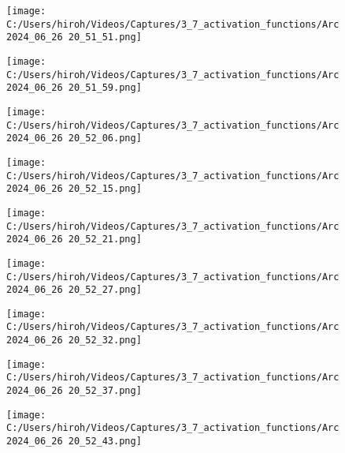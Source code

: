 \documentclass{ltjsarticle}
\begin{document}
\clearpage
\begin{figure}[htbp]
  \centering
  \texttt{[image: C:/Users/hiroh/Videos/Captures/3\_7\_activation\_functions/Arc 2024\_06\_26 20\_51\_51.png]}
\end{figure}
\begin{figure}[htbp]
  \centering
  \texttt{[image: C:/Users/hiroh/Videos/Captures/3\_7\_activation\_functions/Arc 2024\_06\_26 20\_51\_59.png]}
\end{figure}
\begin{figure}[htbp]
  \centering
  \texttt{[image: C:/Users/hiroh/Videos/Captures/3\_7\_activation\_functions/Arc 2024\_06\_26 20\_52\_06.png]}
\end{figure}
\begin{figure}[htbp]
  \centering
  \texttt{[image: C:/Users/hiroh/Videos/Captures/3\_7\_activation\_functions/Arc 2024\_06\_26 20\_52\_15.png]}
\end{figure}
\begin{figure}[htbp]
  \centering
  \texttt{[image: C:/Users/hiroh/Videos/Captures/3\_7\_activation\_functions/Arc 2024\_06\_26 20\_52\_21.png]}
\end{figure}
\begin{figure}[htbp]
  \centering
  \texttt{[image: C:/Users/hiroh/Videos/Captures/3\_7\_activation\_functions/Arc 2024\_06\_26 20\_52\_27.png]}
\end{figure}
\begin{figure}[htbp]
  \centering
  \texttt{[image: C:/Users/hiroh/Videos/Captures/3\_7\_activation\_functions/Arc 2024\_06\_26 20\_52\_32.png]}
\end{figure}
\begin{figure}[htbp]
  \centering
  \texttt{[image: C:/Users/hiroh/Videos/Captures/3\_7\_activation\_functions/Arc 2024\_06\_26 20\_52\_37.png]}
\end{figure}
\begin{figure}[htbp]
  \centering
  \texttt{[image: C:/Users/hiroh/Videos/Captures/3\_7\_activation\_functions/Arc 2024\_06\_26 20\_52\_43.png]}
\end{figure}
\end{document}
